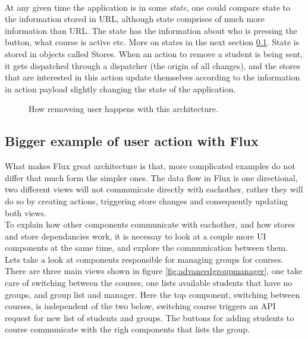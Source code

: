 \\At any given time the application is in some \emph{state}, one could compare state to the information stored in URL, although state comprises of much more information than URL. The state has the information about who is pressing the button, what course is active etc. More on states in the next section \ref{sec:advancedfluxexample}. State is stored in objects called Stores. When an action to remove a student is being sent, it gets dispatched through a dispatcher (the origin of all changes), and the stores that are interested in this action update themselves according to the information in action payload slightly changing the state of the application.

\begin{figure}[h]
  \scalebox{0.8}{}
  \caption{How removeing user happens with this architecture.}
  \label{fig:simplefluxremoveuser}
\end{figure}

\subsection{Bigger example of user action with Flux}\label{sec:advancedfluxexample}
What makes Flux great architecture is that, more complicated examples do not differ that much form the simpler ones. The data flow in Flux is one directional, two different views will not communicate directly with eachother, rather they will do so by creating actions, triggering store changes and consequently updating both views.
\\To explain how other components communicate with eachother, and how stores and store dependancies work, it is necessay to look at a couple more UI components at the same time, and explore the communication between them. Lets take a look at components responsible for managing groups for courses. There are three main views shown in figure \ref{fig:advancedgroupmanager}, one take care of switching between the courses, one lists available students that have no groups, and group list and manager. Here the top component, switching between courses, is independent of the two below, switching course triggers an API request for new list of students and groups. The buttons for adding students to course communicate with the righ components that lists the group.

